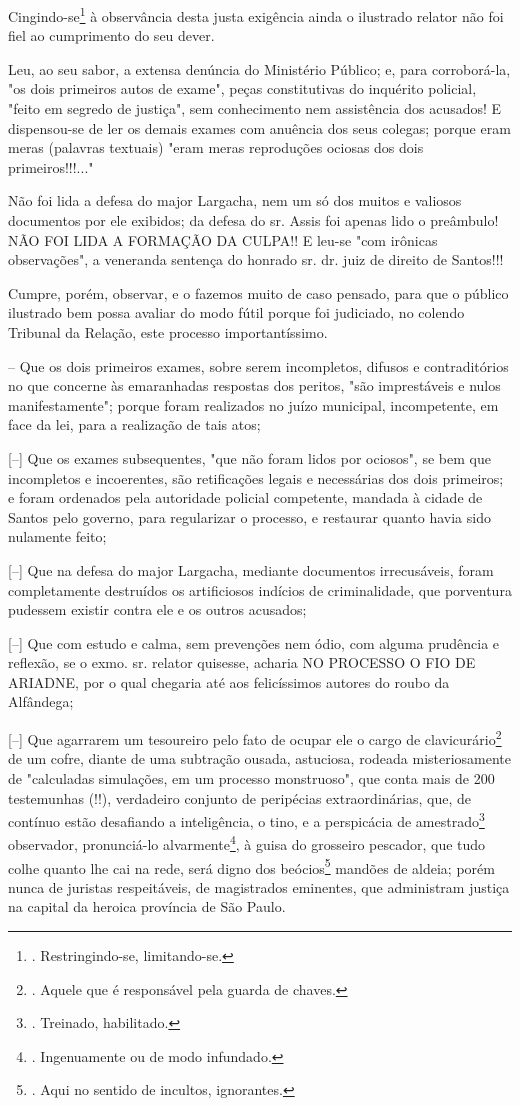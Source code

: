 Cingindo-se\footnote{. Restringindo-se, limitando-se.} à observância
desta justa exigência ainda o ilustrado relator não foi fiel ao
cumprimento do seu dever.

Leu, ao seu sabor, a extensa denúncia do Ministério Público; e, para
corroborá-la, "os dois primeiros autos de exame", peças constitutivas do
inquérito policial, "feito em segredo de justiça", sem conhecimento nem
assistência dos acusados! E dispensou-se de ler os demais exames com
anuência dos seus colegas; porque eram meras (palavras textuais) "eram
meras reproduções ociosas dos dois primeiros!!!..."

Não foi lida a defesa do major Largacha, nem um só dos muitos e valiosos
documentos por ele exibidos; da defesa do sr. Assis foi apenas lido o
preâmbulo! NÃO FOI LIDA A FORMAÇÃO DA CULPA!! E leu-se "com irônicas
observações", a veneranda sentença do honrado sr. dr. juiz de direito de
Santos!!!

Cumpre, porém, observar, e o fazemos muito de caso pensado, para que o
público ilustrado bem possa avaliar do modo fútil porque foi judiciado,
no colendo Tribunal da Relação, este processo importantíssimo.

-- Que os dois primeiros exames, sobre serem incompletos, difusos e
contraditórios no que concerne às emaranhadas respostas dos peritos,
"são imprestáveis e nulos manifestamente"; porque foram realizados no
juízo municipal, incompetente, em face da lei, para a realização de tais
atos;

{[}--{]} Que os exames subsequentes, "que não foram lidos por ociosos",
se bem que incompletos e incoerentes, são retificações legais e
necessárias dos dois primeiros; e foram ordenados pela autoridade
policial competente, mandada à cidade de Santos pelo governo, para
regularizar o processo, e restaurar quanto havia sido nulamente feito;

{[}--{]} Que na defesa do major Largacha, mediante documentos
irrecusáveis, foram completamente destruídos os artificiosos indícios de
criminalidade, que porventura pudessem existir contra ele e os outros
acusados;

{[}--{]} Que com estudo e calma, sem prevenções nem ódio, com alguma
prudência e reflexão, se o exmo. sr. relator quisesse, acharia NO
PROCESSO O FIO DE ARIADNE, por o qual chegaria até aos felicíssimos
autores do roubo da Alfândega;

{[}--{]} Que agarrarem um tesoureiro pelo fato de ocupar ele o cargo de
clavicurário\footnote{. Aquele que é responsável pela guarda de chaves.}
de um cofre, diante de uma subtração ousada, astuciosa, rodeada
misteriosamente de "calculadas simulações, em um processo monstruoso",
que conta mais de 200 testemunhas (!!), verdadeiro conjunto de
peripécias extraordinárias, que, de contínuo estão desafiando a
inteligência, o tino, e a perspicácia de amestrado\footnote{. Treinado,
  habilitado.} observador, pronunciá-lo alvarmente\footnote{.
  Ingenuamente ou de modo infundado.}, à guisa do grosseiro pescador,
que tudo colhe quanto lhe cai na rede, será digno dos beócios\footnote{.
  Aqui no sentido de incultos, ignorantes.} mandões de aldeia; porém
nunca de juristas respeitáveis, de magistrados eminentes, que
administram justiça na capital da heroica província de São Paulo.

